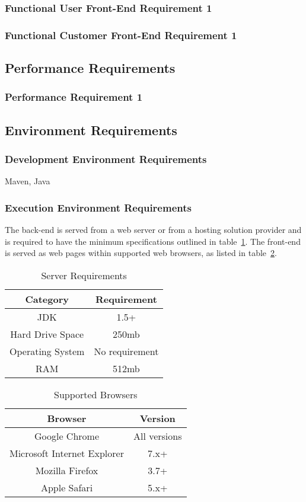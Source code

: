 \documentclass{article}
\begin{document}
\subsubsection{Functional User Front-End Requirement 1}
\label{func-user-front-end-1}


\subsubsection{Functional Customer Front-End Requirement 1}
\label{func-cust-front-end-1}


\subsection{Performance Requirements}
\subsubsection{Performance Requirement 1}
\subsection{Environment Requirements}
\subsubsection{Development Environment Requirements}

Maven, Java

\subsubsection{Execution Environment Requirements}

The back-end is served from a web server or from a hosting solution provider and is
required to have the minimum specifications outlined in table~\ref{server}.  The
front-end is served as web pages within supported web browsers, as listed in
table~\ref{browsers}.

\begin{table}
\centering
\begin{tabular}{|c|c|}\hline
Category & Requirement \\\hline\hline
JDK & 1.5+ \\\hline
Hard Drive Space & 250mb \\\hline
Operating System & No requirement \\\hline
RAM & 512mb \\\hline
\end{tabular}
\caption{Server Requirements}
\label{server}
\end{table}

\begin{table}
\centering
\begin{tabular}{|c|c|}\hline
Browser & Version \\\hline\hline
Google Chrome & All versions  \\\hline
Microsoft Internet Explorer & 7.x+ \\\hline
Mozilla Firefox & 3.7+ \\\hline
Apple Safari & 5.x+ \\\hline
\end{tabular}
\caption{Supported Browsers}
\label{browsers}
\end{table}
\end{document}

